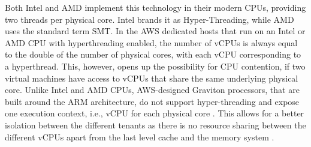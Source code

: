 \noindent
Both Intel and AMD implement this technology in their modern CPUs, providing two threads per physical core. 
Intel brands it as Hyper-Threading, while AMD uses the standard term \ac{SMT}. In the AWS dedicated hosts that run on an Intel or 
AMD CPU with hyperthreading enabled, the number of vCPUs is always equal to the double of the number of 
physical cores, with each vCPU corresponding to a hyperthread. This, however, opens up the possibility 
for CPU contention, if two virtual machines have access to vCPUs that share the same underlying physical core. 
Unlike Intel and AMD CPUs, AWS-designed Graviton processors, that are built around the ARM architecture, 
do not support hyper-threading and expose one execution context, i.e., vCPU for 
each physical core \cite{graviton}. This allows for a better isolation between the different tenants as 
there is no resource sharing between the different vCPUs apart from the last level cache and the memory 
system \cite{graviton}. 

